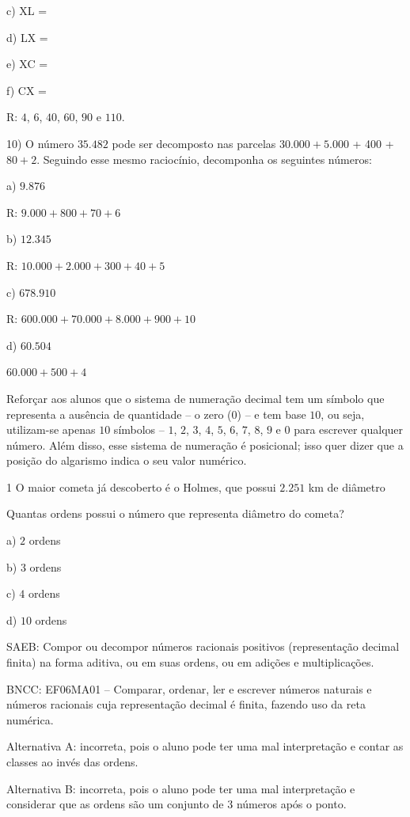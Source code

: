 c) XL =

d) LX =

e) XC =

f) CX =

R: $4$, $6$, $40$, $60$, $90$ e $110$.

10) O número $35.482$ pode ser decomposto nas parcelas $30.000 + 5.000$ +
400 + $80 + 2$. Seguindo esse mesmo raciocínio, decomponha os seguintes
números:

a) $9.876$

R: $9.000 + 800 + 70 + 6$

b) $12.345$

R: $10.000 + 2.000 + 300 + 40 + 5$

c) $678.910$

R: $600.000 + 70.000 + 8.000 + 900 + 10$

d) $60.504$

$60.000 + 500 + 4$

Reforçar aos alunos que o sistema de numeração decimal tem um símbolo
que representa a ausência de quantidade -- o zero ($0$) -- e tem base $10$,
ou seja, utilizam-se apenas $10$ símbolos -- $1$, $2$, $3$, $4$, $5$, $6$, $7$, $8$, $9$ e $0$
para escrever qualquer número. Além disso, esse sistema de numeração é
posicional; isso quer dizer que a posição do algarismo indica o seu
valor numérico.


\num{1}  O maior cometa já descoberto é o Holmes, que possui $2.251$ km de
diâmetro

Quantas ordens possui o número que representa diâmetro do cometa?

a) $2$ ordens

b) $3$ ordens

c) $4$ ordens

d) $10$ ordens

SAEB: Compor ou decompor números racionais positivos (representação
decimal finita) na forma aditiva, ou em suas ordens, ou em adições e
multiplicações.

BNCC: EF06MA01 -- Comparar, ordenar, ler e escrever números naturais e
números racionais cuja representação decimal é finita, fazendo uso da
reta numérica.

Alternativa A: incorreta, pois o aluno pode ter uma mal interpretação e
contar as classes ao invés das ordens.

Alternativa B: incorreta, pois o aluno pode ter uma mal interpretação e
considerar que as ordens são um conjunto de $3$ números após o ponto.

